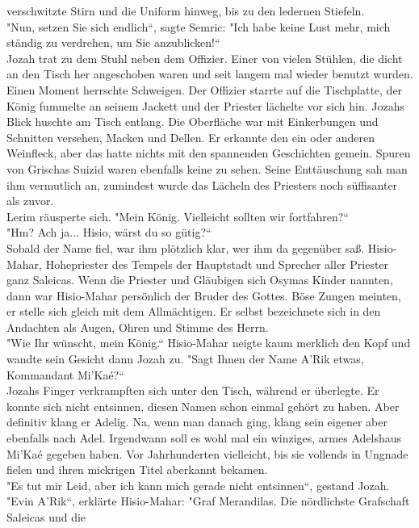 verschwitzte Stirn und die Uniform hinweg, bis zu den ledernen Stiefeln. \\
"Nun, setzen Sie sich endlich``, sagte Semric: "Ich habe keine Lust mehr, mich ständig zu 
verdrehen, um Sie anzublicken!``\\
Jozah trat zu dem Stuhl neben dem Offizier. Einer von vielen Stühlen, die dicht an den Tisch her 
angeschoben waren und seit langem mal wieder benutzt wurden. \\
Einen Moment herrschte Schweigen. Der Offizier starrte auf die Tischplatte, der König fummelte an 
seinem Jackett und der Priester lächelte vor sich hin. Jozahs Blick huschte am Tisch entlang. Die 
Oberfläche war mit Einkerbungen und Schnitten versehen, Macken und Dellen. Er erkannte den ein oder 
anderen Weinfleck, aber das hatte nichts mit den spannenden Geschichten gemein. Spuren von Grischas 
Suizid waren ebenfalls keine zu sehen. Seine Enttäuschung sah man ihm vermutlich an, zumindest 
wurde das Lächeln des Priesters noch süffisanter als zuvor.\\
Lerim räusperte sich. "Mein König. Vielleicht sollten wir fortfahren?``\\
"Hm? Ach ja... Hisio, wärst du so gütig?``\\
 Sobald der Name fiel, war ihm plötzlich klar, wer ihm da gegenüber saß. Hisio-Mahar, Hohepriester 
des Tempels der Hauptstadt und Sprecher aller Priester ganz Saleicas. Wenn die Priester und 
Gläubigen sich Osymas Kinder nannten, dann war Hisio-Mahar persönlich der Bruder des Gottes. Böse 
Zungen meinten, er stelle sich gleich mit dem Allmächtigen. Er selbst bezeichnete sich in den 
Andachten als Augen, Ohren und Stimme des Herrn.\\
"Wie Ihr wünscht, mein König.`` Hisio-Mahar neigte kaum merklich den Kopf und wandte sein Gesicht 
dann Jozah zu. "Sagt Ihnen der Name A'Rik etwas, Kommandant Mi'Kaé?``\\
Jozahs Finger verkrampften sich unter den Tisch, während er überlegte. Er konnte sich nicht 
entsinnen, diesen Namen schon einmal gehört zu haben. Aber definitiv klang er Adelig. Na, wenn man 
danach ging, klang sein eigener aber ebenfalls nach Adel. Irgendwann soll es wohl mal ein winziges, 
armes Adelshaus Mi'Kaé gegeben haben. Vor Jahrhunderten vielleicht, bis sie vollends in Ungnade 
fielen und ihren mickrigen Titel aberkannt bekamen.\\
"Es tut mir Leid, aber ich kann mich gerade nicht entsinnen``, gestand Jozah.\\
"Evin A'Rik``, erklärte Hisio-Mahar: "Graf Merandilas. Die nördlichste Grafschaft Saleicas und die 
